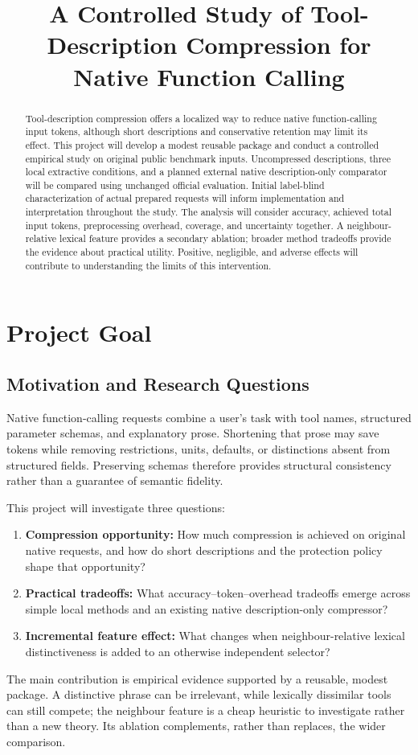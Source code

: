 \documentclass[conference]{IEEEtran}
\title{A Controlled Study of Tool-Description Compression for Native Function Calling}
\author{\IEEEauthorblockN{Jacky Wong}
\IEEEauthorblockA{UID: 3035687479\\
\href{mailto:obwong.jacky@connect.hku.hk}{obwong.jacky@connect.hku.hk}\\
The University of Hong Kong}}
\begin{document}
\maketitle
\begin{abstract}
Tool-description compression offers a localized way to reduce native function-calling input tokens, although short descriptions and conservative retention may limit its effect. This project will develop a modest reusable package and conduct a controlled empirical study on original public benchmark inputs. Uncompressed descriptions, three local extractive conditions, and a planned external native description-only comparator will be compared using unchanged official evaluation. Initial label-blind characterization of actual prepared requests will inform implementation and interpretation throughout the study. The analysis will consider accuracy, achieved total input tokens, preprocessing overhead, coverage, and uncertainty together. A neighbour-relative lexical feature provides a secondary ablation; broader method tradeoffs provide the evidence about practical utility. Positive, negligible, and adverse effects will contribute to understanding the limits of this intervention.
\end{abstract}

\section{Project Goal}
\subsection{Motivation and Research Questions}
Native function-calling requests combine a user's task with tool names, structured parameter schemas, and explanatory prose. Shortening that prose may save tokens while removing restrictions, units, defaults, or distinctions absent from structured fields. Preserving schemas therefore provides structural consistency rather than a guarantee of semantic fidelity.

This project will investigate three questions:
\begin{enumerate}
\item \textbf{Compression opportunity:} How much compression is achieved on original native requests, and how do short descriptions and the protection policy shape that opportunity?
\item \textbf{Practical tradeoffs:} What accuracy--token--overhead tradeoffs emerge across simple local methods and an existing native description-only compressor?
\item \textbf{Incremental feature effect:} What changes when neighbour-relative lexical distinctiveness is added to an otherwise independent selector?
\end{enumerate}
The main contribution is empirical evidence supported by a reusable, modest package. A distinctive phrase can be irrelevant, while lexically dissimilar tools can still compete; the neighbour feature is a cheap heuristic to investigate rather than a new theory. Its ablation complements, rather than replaces, the wider comparison.
\end{document}
